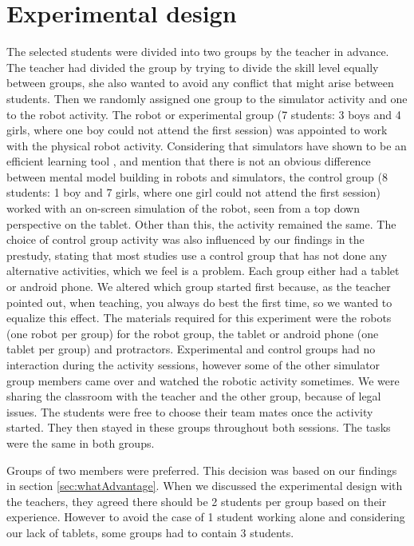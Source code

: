 \chapter{Experimental design}
The selected students were divided into two groups by the teacher in advance. The teacher had divided the group by trying to divide the skill level equally between groups, she also wanted to avoid any conflict that might arise between students. Then we randomly assigned one group to the simulator activity and one to the robot activity. The robot or experimental group (7 students: 3 boys and 4 girls, where one boy could not attend the first session) was appointed to work with the physical robot activity. Considering that simulators have shown to be an efficient learning tool \cite{mitnik2009collaborative}, and \cite{papert1980mindstorms} mention that there is not an obvious difference between mental model building in robots and simulators, the control group (8 students: 1 boy and 7 girls, where one girl could not attend the first session) worked with an on-screen simulation of the robot, seen from a top down perspective on the tablet. Other than this, the activity remained the same. The choice of control group activity was also influenced by our findings in the prestudy, stating that most studies use a control group that has not done any alternative activities, which we feel is a problem. Each group either had a tablet or android phone. We altered which group started first because, as the teacher pointed out, when teaching, you always do best the first time, so we wanted to equalize this effect. The materials required for this experiment were the robots (one robot per group) for the robot group, the tablet or android phone (one tablet per group) and protractors. Experimental and control groups had no interaction during the activity sessions, however some of the other simulator group members came over and watched the robotic activity sometimes. We were sharing the classroom with the teacher and the other group, because of legal issues. The students were free to choose their team mates once the activity started. They then stayed in these groups throughout both sessions. The tasks were the same in both groups.

\bigskip\noindent
Groups of two members were preferred. This decision was based on our findings in section \ref{sec:whatAdvantage}. When we discussed the experimental design with the teachers, they agreed there should be 2 students per group based on their experience. However to avoid the case of 1 student working alone and considering our lack of tablets, some groups had to contain 3 students.
